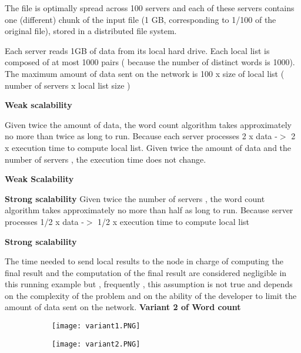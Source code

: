 \documentclass{article}
\begin{document}
The file is optimally spread across 100 servers and each of these servers contains one (different) chunk of the input file (1 GB, corresponding to 1/100 of the original file), stored in a distributed file system.

Each server reads 1GB of data from its local hard drive. Each local list is composed of at most 1000 pairs ( because the number  of distinct words is 1000). The maximum amount of data sent on the network is 100 x size of local list ( number of servers x local list size )

\vspace{2mm}
\textbf{Weak scalability}

Given twice the amount of data, the word count algorithm takes approximately no more than twice as long to run. Because each server processes 2 x data -$>$ 2 x execution time to compute local list. Given twice the amount of data and the number of servers ,  the execution time does not change.

\textbf{Weak Scalability} 

\vspace{2mm}
\textbf{Strong scalability}
Given twice the number of servers , the word count algorithm takes approximately no more than half as long  to run. Because server processes 1/2 x data -$>$ 1/2 x execution time to compute local list


\textbf{Strong scalability} 

\vspace{2mm}
The time needed to send local results to the node in charge of computing the final result and the computation of the final result are considered negligible in this running example but , frequently , this assumption is not true and depends on the complexity of the problem and on the ability of the developer to limit the amount of data sent on the network.
\vspace{3mm}
\textbf{Variant 2 of Word count}


\begin{figure}[ht!]
  \centering
  \begin{subfigure}[b]{0.4\linewidth}
    \texttt{[image: variant1.PNG]}
  \end{subfigure}
     \begin{subfigure}[b]{0.5\textwidth}
         \centering
         \texttt{[image: variant2.PNG]}
     \end{subfigure}
\end{figure}
\end{document}
